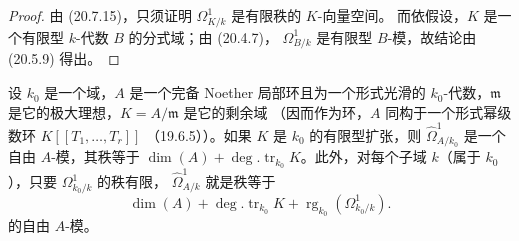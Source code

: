 \begin{proof}
由 (20.7.15)，只须证明 $\Omega^1_{K/k}$ 是有限秩的 $K$-向量空间。
而依假设，$K$ 是一个有限型 $k$-代数 $B$ 的分式域；由 (20.4.7)，
$\Omega^1_{B/k}$ 是有限型 $B$-模，故结论由 (20.5.9) 得出。
\end{proof}

\begin{proposition}[21.9.2]
\label{0.21.9.2-fr}
设 $k_0$ 是一个域，$A$ 是一个完备 Noether 局部环且为一个形式光滑的
$k_0$-代数，$\mathfrak m$ 是它的极大理想，$K=A/\mathfrak m$ 是它的剩余域
（因而作为环，$A$ 同构于一个形式幂级数环 $K[[T_1,\ldots,T_r]]$
（19.6.5））。如果 $K$ 是 $k_0$ 的有限型扩张，则
$\widehat\Omega^1_{A/k_0}$ 是一个自由 $A$-模，其秩等于
$\dim(A)+\deg.\operatorname{tr}_{k_0}K$。此外，对每个子域 $k$（属于
$k_0$），只要 $\Omega^1_{k_0/k}$ 的秩有限，
$\widehat\Omega^1_{A/k}$ 就是秩等于
\[
  \dim(A)+\deg.\operatorname{tr}_{k_0}K
  +\operatorname{rg}_{k_0}(\Omega^1_{k_0/k}).
\]
的自由 $A$-模。
\end{proposition}

